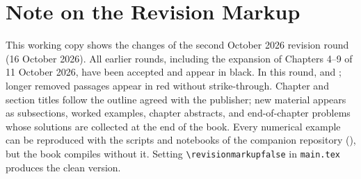 \chapter*{Note on the Revision Markup}
\noindent This working copy shows the changes of the second October 2026 revision round (16 October 2026). All earlier rounds, including the expansion of Chapters 4--9 of 11 October 2026, have been accepted and appear in black. In this round,  and ; longer removed passages appear in red without strike-through. Chapter and section titles follow the outline agreed with the publisher; new material appears as subsections, worked examples, chapter abstracts, and end-of-chapter problems whose solutions are collected at the end of the book. Every numerical example can be reproduced with the scripts and notebooks of the companion repository (), but the book compiles without it. Setting \texttt{\textbackslash revisionmarkupfalse} in \texttt{main.tex} produces the clean version.
